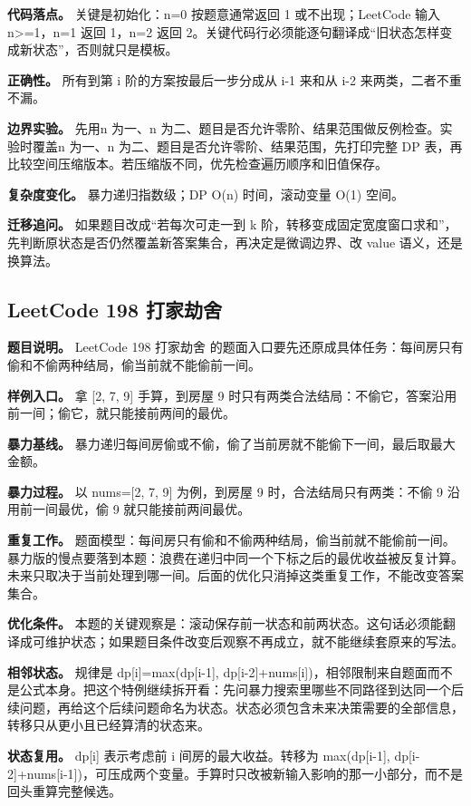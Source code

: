 \textbf{代码落点。} 关键是初始化：n=0 按题意通常返回 1 或不出现；LeetCode 输入 n>=1，n=1 返回 1，n=2 返回 2。关键代码行必须能逐句翻译成“旧状态怎样变成新状态”，否则就只是模板。

\textbf{正确性。} 所有到第 i 阶的方案按最后一步分成从 i-1 来和从 i-2 来两类，二者不重不漏。

\textbf{边界实验。} 先用n 为一、n 为二、题目是否允许零阶、结果范围做反例检查。实验时覆盖n 为一、n 为二、题目是否允许零阶、结果范围，先打印完整 DP 表，再比较空间压缩版本。若压缩版不同，优先检查遍历顺序和旧值保存。

\textbf{复杂度变化。} 暴力递归指数级；DP O(n) 时间，滚动变量 O(1) 空间。

\textbf{迁移追问。} 如果题目改成“若每次可走一到 k 阶，转移变成固定宽度窗口求和”，先判断原状态是否仍然覆盖新答案集合，再决定是微调边界、改 value 语义，还是换算法。

\subsection{LeetCode 198 打家劫舍}

\textbf{题目说明。} LeetCode 198 打家劫舍 的题面入口要先还原成具体任务：每间房只有偷和不偷两种结局，偷当前就不能偷前一间。

\textbf{样例入口。} 拿 [2, 7, 9] 手算，到房屋 9 时只有两类合法结局：不偷它，答案沿用前一间；偷它，就只能接前两间的最优。

\textbf{暴力基线。} 暴力递归每间房偷或不偷，偷了当前房就不能偷下一间，最后取最大金额。

\textbf{暴力过程。} 以 nums=[2, 7, 9] 为例，到房屋 9 时，合法结局只有两类：不偷 9 沿用前一间最优，偷 9 就只能接前两间最优。

\textbf{重复工作。} 题面模型：每间房只有偷和不偷两种结局，偷当前就不能偷前一间。暴力版的慢点要落到本题：浪费在递归中同一个下标之后的最优收益被反复计算。未来只取决于当前处理到哪一间。后面的优化只消掉这类重复工作，不能改变答案集合。

\textbf{优化条件。} 本题的关键观察是：滚动保存前一状态和前两状态。这句话必须能翻译成可维护状态；如果题目条件改变后观察不再成立，就不能继续套原来的写法。

\textbf{相邻状态。} 规律是 dp[i]=max(dp[i-1], dp[i-2]+nums[i])，相邻限制来自题面而不是公式本身。把这个特例继续拆开看：先问暴力搜索里哪些不同路径到达同一个后续问题，再给这个后续问题命名为状态。状态必须包含未来决策需要的全部信息，转移只从更小且已经算清的状态来。

\textbf{状态复用。} dp[i] 表示考虑前 i 间房的最大收益。转移为 max(dp[i-1], dp[i-2]+nums[i-1])，可压成两个变量。手算时只改被新输入影响的那一小部分，而不是回头重算完整候选。

